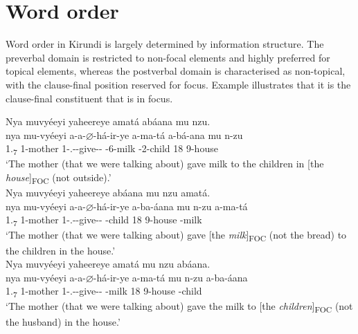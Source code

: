 \documentclass[output=paper]{langscibook}
\begin{document}
\section{Word order}
\label{bkm:Ref81485307}
Word order in Kirundi is largely determined by information structure. The preverbal domain is restricted to non-focal elements and highly preferred for topical elements, whereas the postverbal domain is characterised as non-topical, with the clause-final position reserved for focus. Example  illustrates that it is the clause-final constituent that is in focus.\largerpage[2]

\ea
\label{bkm:Ref74312415}
\ea
Nya muvyéeyi yaheereye amatá abáana mu nzu.\\
\gll
nya  mu-vyéeyi  a-a-$\varnothing$-há-ir-ye  a-ma-tá  a-bá-ana   mu  n-zu \\
1.\DEM{}\textsubscript{7}  1-mother  1\SM-\N.\PST{}-\CJ{}-give-\APPL-\PFV{}  \AUG-{}6-milk  \AUG-{}2-child   18  9-house \\
\glt
    ‘The mother (that we were talking about) gave milk to the children in [the \textit{house}]\textsubscript{FOC} (not outside).’\\

\ex
Nya muvyéeyi yaheereye abáana mu nzu amatá.\\
\gll
nya  mu-vyéeyi  a-a-$\varnothing$-há-ir-ye  a-ba-áana  mu  n-zu  a-ma-tá\\
1.\DEM{}\textsubscript{7}  1-mother  1\SM-\N.\PST-\CJ{}-give-\APPL-\PFV{}  -child  18  9-house  -milk\\
\glt
‘The mother (that we were talking about) gave [the \textit{milk}]\textsubscript{FOC} (not the bread) to the children in the house.’\\

\ex
Nya muvyéeyi yaheereye amatá mu nzu abáana.\\
\gll
nya  mu-vyéeyi  a-a-$\varnothing$-há-ir-ye  a-ma-tá  mu  n-zu  a-ba-áana\\
1.\DEM{}\textsubscript{7}  1-mother  1\SM-\N.\PST-\CJ{}-give-\APPL-\PFV{}  -milk  18  9-house  -child\\
\glt
‘The mother (that we were talking about) gave the milk to [the \textit{children}]\textsubscript{FOC} (not the husband) in the house.’\\
\end{document}
